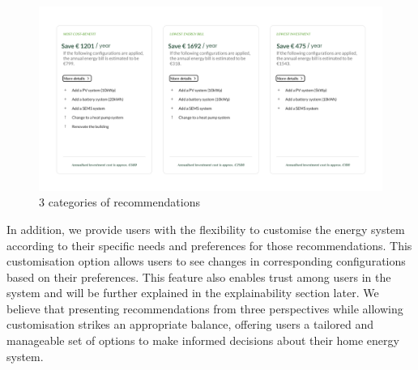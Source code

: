 \begin{figure}[h!]
  \centering
  \includegraphics[width=\textwidth]{Images/rec_categories.png}
  \caption{3 categories of recommendations}
  \label{fig:categories}
\end{figure}

In addition, we provide users with the flexibility to customise the energy system according to their specific needs and preferences for those recommendations. 
This customisation option allows users to see changes in corresponding configurations based on their preferences. 
This feature also enables trust among users in the system and will be further explained in the explainability section later. 
We believe that presenting recommendations from three perspectives while allowing customisation strikes an appropriate balance, offering users a tailored and manageable set of options to make informed decisions about their home energy system.

%

